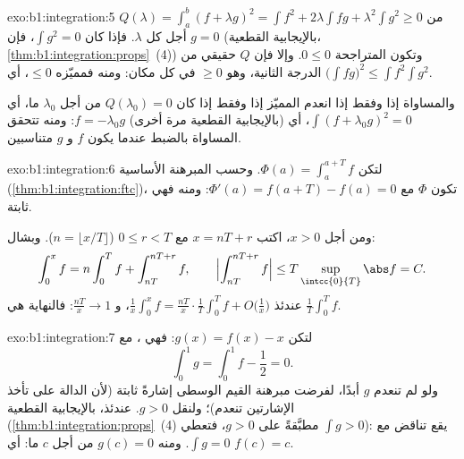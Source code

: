 \begin{solution}{exo:b1:integration:5}
$Q(\lambda) = \int_a^b (f + \lambda g)^2 = \int f^2 + 2\lambda \int
fg + \lambda^2 \int g^2 \geq 0$ من أجل كل $\lambda$. فإذا كان $\int g^2 =
0$، فإن $g = 0$ (بالإيجابية القطعية،
\cref{thm:b1:integration:props}~(4)) وتكون المتراجحة $0 \leq
0$. وإلا فإن $Q$  حقيقي من الدرجة الثانية، وهو $\geq 0$ في كل مكان: ومنه
فمميّزه $\leq 0$، أي $\bigl(\int fg\bigr)^2 \leq \int
f^2 \int g^2$.

والمساواة إذا وفقط إذا انعدم المميّز إذا وفقط إذا كان $Q(\lambda_0) = 0$ من أجل
$\lambda_0$ ما، أي $\int (f + \lambda_0 g)^2 = 0$، أي (بالإيجابية
القطعية مرة أخرى) $f = -\lambda_0 g$: ومنه تتحقق المساواة بالضبط عندما
يكون $f$ و $g$ متناسبين.
\end{solution}

\begin{solution}{exo:b1:integration:6}
لتكن $\Phi(a) = \int_a^{a+T} f$. وحسب المبرهنة الأساسية
(\cref{thm:b1:integration:ftc})، تكون $\Phi$  مع
$\Phi'(a) = f(a + T) - f(a) = 0$: ومنه فهي ثابتة.

ومن أجل $x > 0$، اكتب $x = nT + r$ مع $0 \leq r < T$ ($n = \lfloor x/T
\rfloor$). وبشال:
\[
\int_0^x f = n \int_0^T f + \int_{nT}^{nT + r} f,
\qquad
\Bigl| \int_{nT}^{nT+r} f \Bigr| \leq T \sup_{\intcc{0}{T}} \abs f
= C .
\]
عندئذ $\frac 1x \int_0^x f = \frac{nT}{x}\cdot\frac 1T \int_0^T f +
O\bigl(\frac 1x\bigr)$، و $\frac{nT}{x} \to 1$: فالنهاية هي
$\frac1T \int_0^T f$.
\end{solution}

\begin{solution}{exo:b1:integration:7}
لتكن $g(x) = f(x) - x$: فهي ، مع
\[
\int_0^1 g = \int_0^1 f - \frac12 = 0 .
\]
ولو لم تنعدم $g$ أبدًا، لفرضت مبرهنة القيم الوسطى
إشارةً ثابتة (لأن الدالة  على  تأخذ الإشارتين
تنعدم)؛ ولنقل $g > 0$. عندئذ، بالإيجابية القطعية
(\cref{thm:b1:integration:props}~(4) مطبَّقةً على $g > 0$، فتعطي
$\int g > 0$): يقع تناقض مع $\int g = 0$. ومنه $g(c) = 0$ من أجل
$c$ ما: أي $f(c) = c$.
\end{solution}


